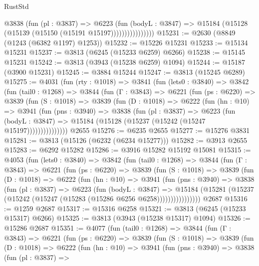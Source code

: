 \begin{lexlean}{RustStd}
\begin{coremodule}
                      @3838
                        (fun (pl : @3837) =>
                        @6223
                          (fun (bodyL : @3847) =>
                          @15184 (@15128 (@15139 (@15150 (@15191 @15197))))))))))))))))
@15231 := @2630 (@8849 (@1243 (@6382 @1197) @1253))
@15232 := @15226 @15231
@15233 := @15134 @15231
@15237 := @3813 (@6245 (@15233 @6259) @6266)
@15238 := @15145 @15231
@15242 := @3813 (@3943 (@15238 @6259) @1094)
@15244 := @15187 (@3900 @15231)
@15245 := @3884 @15244
@15247 := @3813 (@15245 @6289)
@15275 := @4031
    (fun (rty : @1018) =>
    @3841
      (fun (lets0 : @3840) =>
      @3842
        (fun (tail0 : @1268) =>
        @3844
          (fun (Γ : @3843) =>
          @6221
            (fun (ps : @6220) =>
            @3839
              (fun (S : @1018) =>
              @3839
                (fun (D : @1018) =>
                @6222
                  (fun (hn : @10) =>
                  @3941
                    (fun (pns : @3940) =>
                    @3838
                      (fun (pl : @3837) =>
                      @6223
                        (fun (bodyL : @3847) =>
                        @15184 (@15128 (@15237 (@15242 (@15247 @15197)))))))))))))))
    @2655
@15276 := @6235 @2655
@15277 := @15276 @3831
@15281 := @3813 (@15126 (@6232 (@6234 @15277)))
@15282 := @3913 @2655
@15283 := @6292 @15282
@15286 := @3916 @15282 @15192 @15081
@15315 := @4053
    (fun (lets0 : @3840) =>
    @3842
      (fun (tail0 : @1268) =>
      @3844
        (fun (Γ : @3843) =>
        @6221
          (fun (ps : @6220) =>
          @3839
            (fun (S : @1018) =>
            @3839
              (fun (D : @1018) =>
              @6222
                (fun (hn : @10) =>
                @3941
                  (fun (pns : @3940) =>
                  @3838
                    (fun (pl : @3837) =>
                    @6223
                      (fun (bodyL : @3847) =>
                      @15184
                        (@15281 (@15237 (@15242 (@15247 (@15283 (@15286 @6256 @6258))))))))))))))))
    @2687
@15316 := @1259 @2687
@15317 := @15316 @6258
@15321 := @3813 (@6245 (@15233 @15317) @6266)
@15325 := @3813 (@3943 (@15238 @15317) @1094)
@15326 := @15286 @2687
@15351 := @4077
    (fun (tail0 : @1268) =>
    @3844
      (fun (Γ : @3843) =>
      @6221
        (fun (ps : @6220) =>
        @3839
          (fun (S : @1018) =>
          @3839
            (fun (D : @1018) =>
            @6222
              (fun (hn : @10) =>
              @3941
                (fun (pns : @3940) =>
                @3838
                  (fun (pl : @3837) =>

\end{coremodule}
\end{lexlean}
